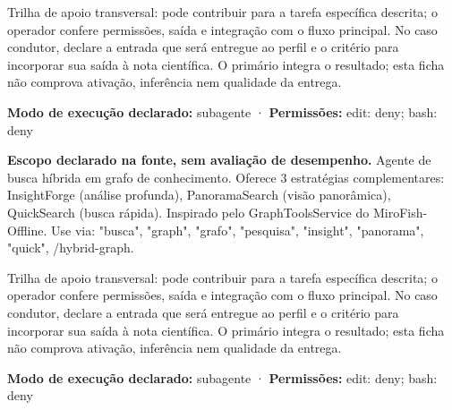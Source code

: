 \begin{funcao}
Trilha de apoio transversal: pode contribuir para a tarefa específica descrita; o operador confere permissões, saída e integração com o fluxo principal. No caso condutor, declare a entrada que será entregue ao perfil e o critério para incorporar sua saída à nota científica. O primário integra o resultado; esta ficha não comprova ativação, inferência nem qualidade da entrega.
\end{funcao}

\begin{arquitetura}
\textbf{Modo de execução declarado:} subagente · \textbf{Permissões:} edit: deny; bash: deny
\end{arquitetura}


\begin{descricao}
\textbf{Escopo declarado na fonte, sem avaliação de desempenho.}
Agente de busca híbrida em grafo de conhecimento. Oferece 3 estratégias complementares: InsightForge (análise profunda), PanoramaSearch (visão panorâmica), QuickSearch (busca rápida). Inspirado pelo GraphToolsService do MiroFish-Offline. Use via: "busca", "graph", "grafo", "pesquisa", "insight", "panorama", "quick", /hybrid-graph.
\end{descricao}

\begin{funcao}
Trilha de apoio transversal: pode contribuir para a tarefa específica descrita; o operador confere permissões, saída e integração com o fluxo principal. No caso condutor, declare a entrada que será entregue ao perfil e o critério para incorporar sua saída à nota científica. O primário integra o resultado; esta ficha não comprova ativação, inferência nem qualidade da entrega.
\end{funcao}

\begin{arquitetura}
\textbf{Modo de execução declarado:} subagente · \textbf{Permissões:} edit: deny; bash: deny
\end{arquitetura}


